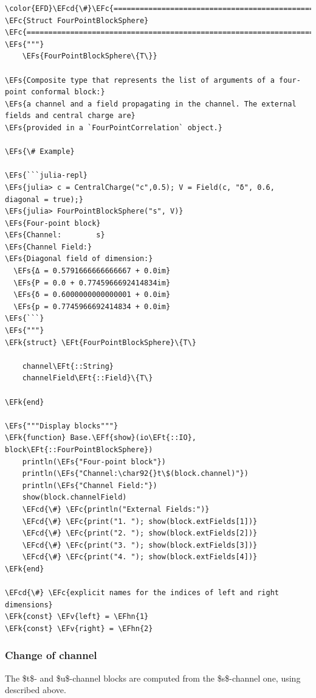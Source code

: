 \documentclass[a4paper]{article}
\numberwithin{equation}{section}
\newcommand{\EFc}[1]{\textcolor{EFc}{#1}} %
\newcommand{\EFcd}[1]{\textcolor{EFcd}{#1}} %
\newcommand{\EFs}[1]{\textcolor{EFs}{#1}} %
\newcommand{\EFk}[1]{\textcolor{EFk}{#1}} %
\newcommand{\EFf}[1]{\textcolor{EFf}{#1}} %
\newcommand{\EFv}[1]{\textcolor{EFv}{#1}} %
\newcommand{\EFt}[1]{\textcolor{EFt}{#1}} %
\newcommand{\EFhn}[1]{\textcolor{EFhn}{#1}} %
\begin{document}
\begin{Code}
\begin{Verbatim}
\color{EFD}\EFcd{\#}\EFc{===========================================================================================}
\EFc{Struct FourPointBlockSphere}
\EFc{===========================================================================================\#}
\EFs{"""}
    \EFs{FourPointBlockSphere\{T\}}

\EFs{Composite type that represents the list of arguments of a four-point conformal block:}
\EFs{a channel and a field propagating in the channel. The external fields and central charge are}
\EFs{provided in a `FourPointCorrelation` object.}

\EFs{\# Example}

\EFs{```julia-repl}
\EFs{julia> c = CentralCharge("c",0.5); V = Field(c, "δ", 0.6, diagonal = true);}
\EFs{julia> FourPointBlockSphere("s", V)}
\EFs{Four-point block}
\EFs{Channel:        s}
\EFs{Channel Field:}
\EFs{Diagonal field of dimension:}
  \EFs{Δ = 0.5791666666666667 + 0.0im}
  \EFs{P = 0.0 + 0.7745966692414834im}
  \EFs{δ = 0.6000000000000001 + 0.0im}
  \EFs{p = 0.7745966692414834 + 0.0im}
\EFs{```}
\EFs{"""}
\EFk{struct} \EFt{FourPointBlockSphere}\{T\}

    channel\EFt{::String}
    channelField\EFt{::Field}\{T\}

\EFk{end}

\EFs{"""Display blocks"""}
\EFk{function} Base.\EFf{show}(io\EFt{::IO}, block\EFt{::FourPointBlockSphere})
    println(\EFs{"Four-point block"})
    println(\EFs{"Channel:\char92{}t\$(block.channel)"})
    println(\EFs{"Channel Field:"})
    show(block.channelField)
    \EFcd{\#} \EFc{println("External Fields:")}
    \EFcd{\#} \EFc{print("1. "); show(block.extFields[1])}
    \EFcd{\#} \EFc{print("2. "); show(block.extFields[2])}
    \EFcd{\#} \EFc{print("3. "); show(block.extFields[3])}
    \EFcd{\#} \EFc{print("4. "); show(block.extFields[4])}
\EFk{end}

\EFcd{\#} \EFc{explicit names for the indices of left and right dimensions}
\EFk{const} \EFv{left} = \EFhn{1}
\EFk{const} \EFv{right} = \EFhn{2}
\end{Verbatim}
\end{Code}
\subsubsection*{Change of channel}
\label{sec:orgc2254ac}

The \$t\$- and \$u\$-channel blocks are computed from the \$s\$-channel one, using described above.
\end{document}

